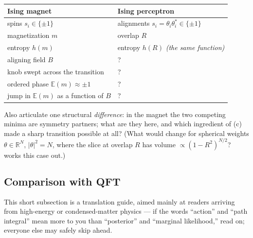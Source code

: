\documentclass[11pt]{article}
\newcommand{\R}{\mathbb{R}}
\newcommand{\E}{\mathbb{E}}
\begin{document}
\begin{exercise}
\begin{enumerate}
\begin{center}
    \small
    \renewcommand{\arraystretch}{1.3}
    \begin{tabular}{l|l}
        \textbf{Ising magnet} & \textbf{Ising perceptron} \\\hline
        spins $s_i\in\{\pm1\}$ & alignments $s_i = \theta_i\theta_i^*\in\{\pm1\}$ \\
        magnetization $m$ & overlap $R$ \\
        entropy $h(m)$ & entropy $h(R)$ \emph{(the same function)} \\
        aligning field $B$ & ? \\
        knob swept across the transition & ? \\
        ordered phase $\E(m)\approx\pm1$ & ? \\
        jump in $\E(m)$ as a function of $B$ & ? \\
    \end{tabular}
    \end{center}
    Also articulate one structural \emph{difference}: in the magnet the two competing minima are symmetry partners; what are they here, and which ingredient of (c) made a sharp transition possible at all? (What would change for spherical weights $\theta\in\R^N$, $|\theta|^2 = N$, where the slice at overlap $R$ has volume $\propto(1-R^2)^{N/2}$?  works this case out.)
\end{enumerate}
\end{exercise}

\subsection{Comparison with QFT}
\label{sec:QFT-comparison}

This short subsection is a translation guide, aimed mainly at readers arriving from high-energy or condensed-matter physics --- if the words ``action'' and ``path integral'' mean more to you than ``posterior'' and ``marginal likelihood,'' read on; everyone else may safely skip ahead.
\end{document}
